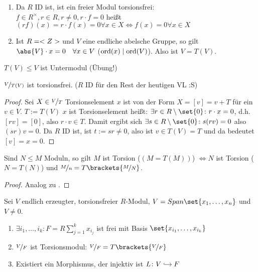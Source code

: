 \begin{example}
	\begin{enumerate}
		\item Da $R$ ID ist, ist ein freier Modul torsionsfrei:\\
		$f \in R^{\times}, r \in R, r \neq 0, r \cdot f = 0$ heißt $(rf)(x) = r \cdot f(x) = 0 \forall x \in X \Leftrightarrow f(x) = 0 \forall x \in X$
		\item Ist $R = <Z>$ und $V$ eine endliche abelsche Gruppe, so gilt $\abs{V}\cdot x = 0\quad \forall x \in V$ ($\operatorname{ord}(x) \mid \operatorname{ord}(V)$). Also ist $V = T(V)$.
	\end{enumerate}
\end{example}
\begin{*remark}
	$T(V) \le V$ ist Untermodul (Übung!)
\end{*remark}
\begin{lemma}
	$\lnkset{V}{T(V)}$ ist torsionsfrei. ($R$ ID für den Rest der heutigen VL :S)
\end{lemma}
\begin{proof}
	Sei $X \in \lnkset{V}{T}$ Torsionselement $x$ ist von der Form $X = [v] = v + T$ für ein $v\in V$. $T := T(V)$ $x$ ist Torsionselement heißt: $\exists r \in R \setminus \set{0}\colon r \cdot x = 0$, d.h. $[rv] = [0]$, also $r \cdot v \in T$. Damit ergibt sich $\exists s \in R \setminus \set{0}\colon s(rv) = 0$ also $(sr)v = 0$. Da $R$ ID ist, ist $t:= sr \neq 0$, also ist $v \in T(V) = T$ und da bedeutet $[v] = x = 0$.
\end{proof}
\begin{lemma}
	Sind $N \le M$ Moduln, so gilt $M$ ist Torsion ($(M = T(M))$) $\Leftrightarrow N$ ist Torsion ($N = T(N)$) und $\lnkset{M}{n} = T\brackets{\lnkset{M}{N}}$.
\end{lemma}
\begin{proof}
	Analog zu .
\end{proof}
\begin{proposition}
	Sei $V$ endlich erzeugter, torsionsfreier $R$-Modul, $V = Span\set{x_1, \dots, x_n}$ und $V \neq 0$.
	\begin{enumerate}
		\item $\exists i_1, \dots, i_k \colon F = R\sum_{j=1}^k x_{i_j}$ ist frei mit Basis $\set{x_{i_1}, \dots, x_{i_k}}$
		\item $\lnkset{V}{F}$ ist Torsionsmodul: $\lnkset{V}{F} = T\brackets{\lnkset{V}{F}}$
		\item Existiert ein Morphismus, der injektiv ist $L \colon \begin{tikzcd}[cramped, sep=small]
		V \arrow[r, hook] & F
		\end{tikzcd}$
	\end{enumerate}
\end{proposition}

